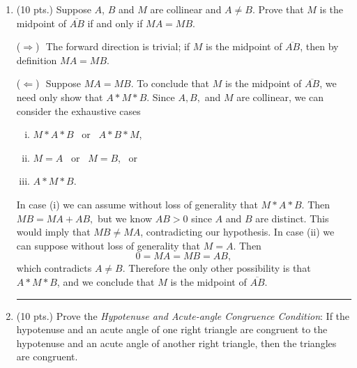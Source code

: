 \documentclass[12pt]{article}
\newcommand{\forward}{\noindent ($\Longrightarrow$) \,\,}
\newcommand{\back}{\noindent ($\Longleftarrow$) \,\,}
\newcommand{\ray}[1]{\overrightarrow{#1}}
\renewcommand{\line}[1]{\stackrel{\longleftrightarrow}{#1}}
\newcommand{\seg}[1]{\overline{#1}}
\newenvironment{proof}{\noindent {\bf Proof:}}{\hfill
\rule{1mm}{3mm} \bigskip}
\begin{document}
\begin{enumerate}
	

	
\item (10 pts.) Suppose $A$, $B$ and $M$ are collinear and $A\ne B$.  Prove that $M$ is the midpoint of $\seg{AB}$ if and only if $MA = MB$. 

	\begin{proof} \forward The forward direction is trivial; if $M$ is the midpoint of $\seg{AB}$, then by definition $MA=MB$.
	
	\back Suppose $MA=MB$. To conclude that $M$ is the midpoint of $\seg{AB}$, we need only show that $A*M*B$. Since $A,B,$ and $M$ are collinear, we can consider the exhaustive cases \begin{enumerate}[(i)] \item{ $M*A*B$ \ or \ $A*B*M$,} 
	\item{$M=A$ \ or \ $M=B$, \ or}
	\item{$A*M*B$.}
\end{enumerate}
In case (i) we can assume without loss of generality that $M*A*B$. Then $MB = MA + AB,$ but we know $AB>0$ since $A$ and $B$ are distinct. This would imply that $MB \ne MA$, contradicting our hypothesis. In case (ii) we can suppose without loss of generality that $M=A$. Then $$0=MA=MB=AB,$$ which contradicts $A\ne B$. Therefore the only other possibility is that $A*M*B$, and we conclude that $M$ is the midpoint of $\seg{AB}$.
	\end{proof}

\item (10 pts.) Prove the {\em Hypotenuse and Acute-angle Congruence Condition}:  If the hypotenuse and an acute angle of one right triangle are congruent to the hypotenuse and an acute angle of another right triangle, then the triangles are congruent.


\end{enumerate}
\end{document}
